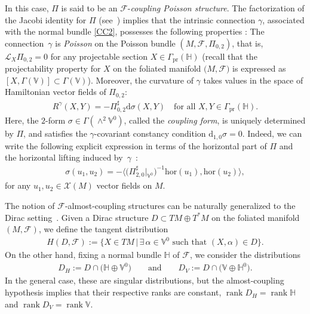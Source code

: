 \documentclass[10pt,a4paper]{amsart}
\numberwithin{equation}{section}
\begin{document}
In this case, $\Pi$ is said to be an $\mathcal{F}$-\emph{coupling Poisson structure}.
The factorization of the Jacobi identity for $\Pi$ (see~\cite[equations (6.4)--(6.6)]{JVYV-14}) implies that the intrinsic connection $\gamma$, associated with the normal bundle \eqref{CC2}, possesses the following properties \cite{Va-04, Vo-01}: The connection~$\gamma$ is \emph{Poisson} on the Poisson bundle $(M,\mathcal{F},\Pi_{0,2})$, that is, $\mathcal{L}_{X}\Pi_{0,2}=0$ for any projectable section $X\in\Gamma_{\operatorname*{pr}}(\mathbb{H})$ (recall that the projectability property for $X$ on the foliated manifold $(M,\mathcal{F)}$ is expressed as $[X,\Gamma(\mathbb{V})]\subset\Gamma(\mathbb{V})$). Moreover, the curvature of $\gamma$ takes values in the space of Hamiltonian vector f\/ields of $\Pi_{0,2}$:
\begin{gather}\label{Cur}
R^{\gamma}(X,Y)=-\Pi_{0,2}^{\sharp}\mathrm{d}\sigma(X,Y)\quad \mbox{for all } X,Y\in\Gamma_{\operatorname*{pr}}(\mathbb{H}).
\end{gather}
Here, the $2$-form $\sigma\in\Gamma(\wedge^{2}\mathbb{V}^{0})$, called the \emph{coupling form}, is uniquely determined by $\Pi$, and satisf\/ies the $\gamma$-covariant constancy condition $\mathrm{d}_{1,0}\sigma=0$. Indeed, we can write the following explicit expression in terms of the horizontal part of $\Pi$ and the horizontal lifting induced by~$\gamma$~\cite{Vo-01}:
\begin{gather*}
\sigma (u_1,u_2)=-\big\langle \big(\Pi^\sharp_{2,0}\big|_{\mathbb{V}^0}\big)^{-1} \mathrm{hor}(u_1),\mathrm{hor}(u_2)\big\rangle,
\end{gather*}
for any $u_1,u_2\in\mathcal{X}(M)$ vector f\/ields on $M$.

The notion of $\mathcal{F}$-almost-coupling structures can be naturally generalized to the Dirac set\-ting~\cite{Va-06}. Given a Dirac structure $D\subset TM\oplus T^{\ast}M$ on the foliated manifold $(M,\mathcal{F})$, we def\/ine the tangent distribution
\begin{gather*}
H(D,\mathcal{F}):=\big\{X\in TM\,|\,\exists\,\alpha\in\mathbb{V}^{0}\mbox{ such that }(X,\alpha)\in D\big\}.
\end{gather*}
On the other hand, f\/ixing a normal bundle $\mathbb{H}$ of $\mathcal{F}$, we
consider the distributions
\begin{gather*}
D_{H}:=D\cap\big(\mathbb{H}\oplus\mathbb{V}^{0}\big)\qquad\mbox{and}\qquad D_{V}:=D\cap\big(\mathbb{V}\oplus\mathbb{H}^{0}\big).
\end{gather*}
In the general case, these are singular distributions, but the almost-coupling hypothesis implies that their respective ranks are constant, $\operatorname{rank}D_{H}=\operatorname{rank} \mathbb{H}$ and $\operatorname{rank}D_{V}=\operatorname{rank} \mathbb{V}$.
\end{document}
